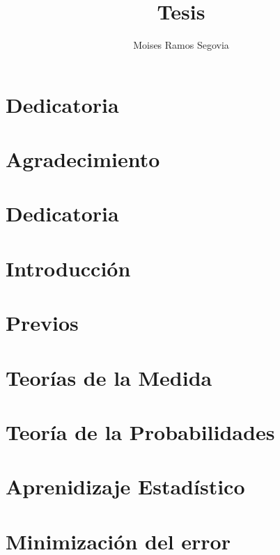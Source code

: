 \documentclass[12pt,a4paper,openany]{book}
\author{Moises Ramos Segovia}
\title{Tesis}
\begin{document}
	
	
	\chapter*{Dedicatoria}
		\begin{flushright}
			\textit{\lipsum[2]}
		\end{flushright}	

	\chapter*{Agradecimiento}
	\lipsum[2]
	
	\chapter*{Dedicatoria}
	\lipsum[1]
	\chapter{Introducción}
	\lipsum
	
	\chapter{Previos}
	\lipsum \lipsum[3]
	
	\chapter{Teorías de la Medida}
	\lipsum \lipsum[2]
	
	\chapter{Teoría de la Probabilidades}
	\lipsum[5] \lipsum[4]
	
	\chapter{Aprenidizaje Estadístico}
	\lipsum \lipsum[1]
	
	\chapter{Minimización del error}
	\lipsum \lipsum[3]
	
\end{document}
